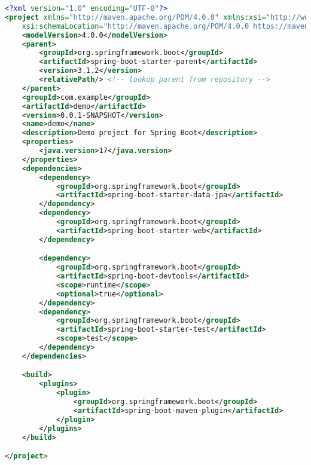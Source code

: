 \begin{lstlisting}[language=XML,caption = pom.xml con dipendenze selezionate]
<?xml version="1.0" encoding="UTF-8"?>
<project xmlns="http://maven.apache.org/POM/4.0.0" xmlns:xsi="http://www.w3.org/2001/XMLSchema-instance"
	xsi:schemaLocation="http://maven.apache.org/POM/4.0.0 https://maven.apache.org/xsd/maven-4.0.0.xsd">
	<modelVersion>4.0.0</modelVersion>
	<parent>
		<groupId>org.springframework.boot</groupId>
		<artifactId>spring-boot-starter-parent</artifactId>
		<version>3.1.2</version>
		<relativePath/> <!-- lookup parent from repository -->
	</parent>
	<groupId>com.example</groupId>
	<artifactId>demo</artifactId>
	<version>0.0.1-SNAPSHOT</version>
	<name>demo</name>
	<description>Demo project for Spring Boot</description>
	<properties>
		<java.version>17</java.version>
	</properties>
	<dependencies>
		<dependency>
			<groupId>org.springframework.boot</groupId>
			<artifactId>spring-boot-starter-data-jpa</artifactId>
		</dependency>
		<dependency>
			<groupId>org.springframework.boot</groupId>
			<artifactId>spring-boot-starter-web</artifactId>
		</dependency>

		<dependency>
			<groupId>org.springframework.boot</groupId>
			<artifactId>spring-boot-devtools</artifactId>
			<scope>runtime</scope>
			<optional>true</optional>
		</dependency>
		<dependency>
			<groupId>org.springframework.boot</groupId>
			<artifactId>spring-boot-starter-test</artifactId>
			<scope>test</scope>
		</dependency>
	</dependencies>

	<build>
		<plugins>
			<plugin>
				<groupId>org.springframework.boot</groupId>
				<artifactId>spring-boot-maven-plugin</artifactId>
			</plugin>
		</plugins>
	</build>

</project>
\end{lstlisting}
\pagebreak

